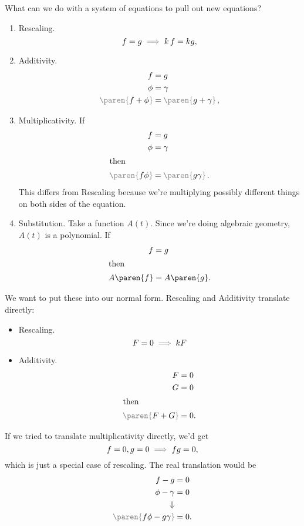 \documentclass[a5paper]{scrartcl}
\newcommand{\gray}[1]{{\color{gray}#1}}
\newcommand{\black}[1]{{\color{black}#1}}
\newcommand{\gparen}[1]{\left .\!{\gray{\paren{\black{#1}}}}\!\right.}
\let\oldimplies\implies
\def\implies{\color{gray}\oldimplies\color{black}}
\theoremstyle{nonumberplain}
\begin{document}
What can we do with a system of equations to pull out new equations?
\begin{enumerate}
  \item Rescaling.
        \[
        f=g \implies k\,f= kg,
        \]
  \item Additivity.
        \begin{align*}
          f &= g \\
          \phi &= \gamma \\
          \gparen{f+\phi} &= \gparen{g+\gamma},
        \end{align*}
  \item Multiplicativity. If
        \begin{align*}
          f &= g \\
          \phi &= \gamma \\
          \intertext{then}
          \gparen{f\phi} &=\gparen{g\gamma}.
        \end{align*}
        This differs from Rescaling because we're multiplying possibly different things on both sides of the equation.
  \item Substitution. Take a function \(A(t)\). Since we're doing algebraic geometry, \(A(t)\) is a polynomial. If
        \begin{align*}
          f &= g \\
          \shortintertext{then}
          A\paren{f} &= A\paren{g}.
        \end{align*}
\end{enumerate}
We want to put these into our normal form. Rescaling and Additivity translate directly:
\begin{itemize}
  \item Rescaling.
        \[
        F = 0 \implies kF
        \]
  \item Additivity.
        \begin{align*}
          F &= 0 \\
          G &= 0 \\
          \shortintertext{then}
          \gparen{F+G} &=0.
        \end{align*}
\end{itemize}
If we tried to translate multiplicativity directly, we'd get
\[
  f= 0, g = 0 \implies fg = 0,
\]
which is just a special case of rescaling. The real translation would be
\begin{align*}
  f - g &= 0  \\
  \phi - \gamma &= 0 \\
  \Downarrow & \\
  \gparen{f\phi -g\gamma} &= 0.
\end{align*}
\end{document}
